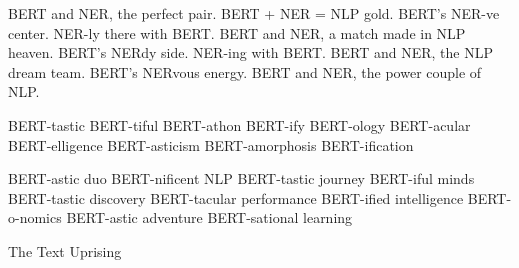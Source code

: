 BERT and NER, the perfect pair.
BERT + NER = NLP gold.
BERT's NER-ve center.
NER-ly there with BERT.
BERT and NER, a match made in NLP heaven.
BERT's NERdy side.
NER-ing with BERT.
BERT and NER, the NLP dream team.
BERT's NERvous energy.
BERT and NER, the power couple of NLP.

BERT-tastic
BERT-tiful
BERT-athon
BERT-ify
BERT-ology
BERT-acular
BERT-elligence
BERT-asticism
BERT-amorphosis
BERT-ification

BERT-astic duo
BERT-nificent NLP
BERT-tastic journey
BERT-iful minds
BERT-tastic discovery
BERT-tacular performance
BERT-ified intelligence
BERT-o-nomics
BERT-astic adventure
BERT-sational learning

The Text Uprising